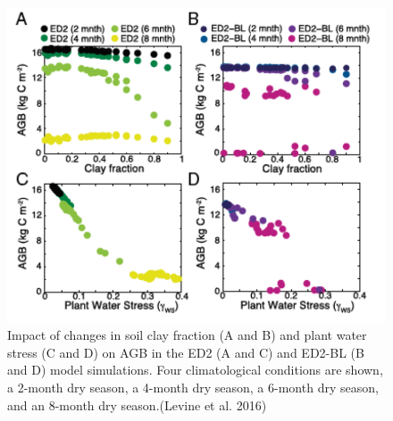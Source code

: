 \documentclass[12pt,oneside]{book}
\begin{document}
\begin{figure}

{\centering \includegraphics[width=0.8\linewidth]{figures/chap6/f637_levine1} 

}

\caption{Impact of changes in soil clay fraction (A and B) and plant water stress (C and D) on AGB in the ED2 (A and C) and ED2-BL (B and D) model simulations. Four climatological conditions are shown, a 2-month dry season, a 4-month dry season, a 6-month dry season, and an 8-month dry season.(Levine et al. 2016)}\label{fig:f637}
\end{figure}
\end{document}
